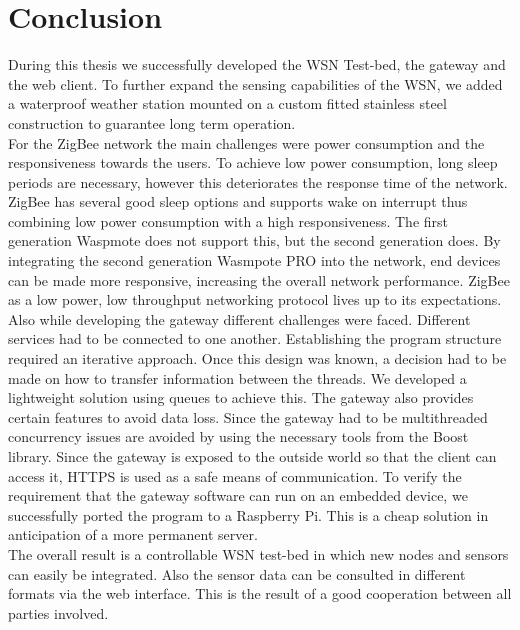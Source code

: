 \section{Conclusion}
During this thesis we successfully developed the WSN Test-bed, the gateway and the web client. To further expand the sensing capabilities of the WSN, we added a waterproof weather station mounted on a custom fitted stainless steel construction to guarantee long term operation.\\
For the ZigBee network the main challenges were power consumption and the responsiveness towards the users. To achieve low power consumption, long sleep periods are necessary, however this deteriorates the response time of the network. ZigBee has several good sleep options and supports wake on interrupt thus combining low power consumption with a high responsiveness. The first generation Waspmote does not support this, but the second generation does. By integrating the second generation Wasmpote PRO into the network, end devices can be made more responsive, increasing the overall network performance. ZigBee as a low power, low throughput networking protocol lives up to its expectations.\\
Also while developing the gateway different challenges were faced. Different services had to be connected to one another. Establishing the program structure required an iterative approach. Once this design was known, a decision had to be made on how to transfer information between the threads. We developed a lightweight solution using queues to achieve this. The gateway also provides certain features to avoid data loss. Since the gateway had to be multithreaded concurrency issues are avoided by using the necessary tools from the Boost library. Since the gateway is exposed to the outside world so that the client can access it, HTTPS is used as a safe means of communication. To verify the requirement that the gateway software can run on an embedded device, we successfully ported the program to a Raspberry Pi. This is a cheap solution in anticipation of a more permanent server.\\
The overall result is a controllable WSN test-bed in which new nodes and sensors can easily be integrated. Also the sensor data can be consulted in different formats via the web interface. This is the result of a good cooperation between all parties involved.

